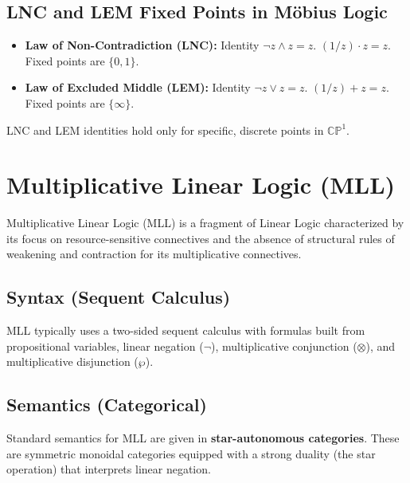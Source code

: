 	\subsection{LNC and LEM Fixed Points in Möbius Logic}
	\begin{itemize}
		\item \textbf{Law of Non-Contradiction (LNC):} Identity $\neg z \wedge z = z$.
		$(1/z) \cdot z = z$. Fixed points are $\{0, 1\}$.
		\item \textbf{Law of Excluded Middle (LEM):} Identity $\neg z \vee z = z$.
		$(1/z) + z = z$. Fixed points are $\{\infty\}$.
	\end{itemize}
	LNC and LEM identities hold only for specific, discrete points in $\mathbb{CP}^1$.

	\section{Multiplicative Linear Logic (MLL)}

	Multiplicative Linear Logic (MLL) is a fragment of Linear Logic characterized by its focus on resource-sensitive connectives and the absence of structural rules of weakening and contraction for its multiplicative connectives.

	\subsection{Syntax (Sequent Calculus)}
	MLL typically uses a two-sided sequent calculus with formulas built from propositional variables, linear negation ($\neg$), multiplicative conjunction ($\otimes$), and multiplicative disjunction ($\wp$).

	\subsection{Semantics (Categorical)}
	Standard semantics for MLL are given in \textbf{star-autonomous categories}. These are symmetric monoidal categories equipped with a strong duality (the star operation) that interprets linear negation.

